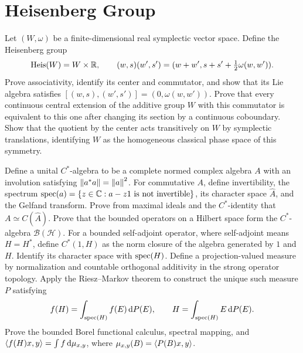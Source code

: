\section{Heisenberg Group}

\begin{exercise}
Let $(W,\omega)$ be a finite-dimensional real symplectic vector space.
Define the Heisenberg group
\[
 \operatorname{Heis}(W)=W\times\mathbb R,
 \qquad (w,s)(w',s')=(w+w',s+s'+\tfrac12\omega(w,w')).
\]
Prove associativity, identify its center and commutator, and show that its Lie
algebra satisfies $[(w,s),(w',s')]=(0,\omega(w,w'))$.  Prove that every
continuous central extension of the additive group $W$ with this commutator
is equivalent to this one after changing its section by a continuous
coboundary.  Show that the quotient by the center acts transitively on $W$ by
symplectic translations, identifying $W$ as the homogeneous classical phase
space of this symmetry.
\end{exercise}

\begin{exercise}
Define a unital $C^*$-algebra to be a complete normed complex algebra $A$
with an involution satisfying $\left\lVert a^*a\right\rVert=\left\lVert a\right\rVert^2$.  For commutative $A$,
define invertibility, the spectrum
$\operatorname{spec}(a)=\{z\in\mathbb C:a-z1\text{ is not invertible}\}$, its character space
$\widehat A$, and the Gelfand transform.  Prove from
maximal ideals and the $C^*$-identity that
$A\simeq C(\widehat A)$.  Prove that the bounded operators on a Hilbert space
form the $C^*$-algebra $\mathcal B(\mathcal H)$.  For a bounded self-adjoint
operator, where self-adjoint means $H=H^*$, define $C^*(1,H)$ as the norm
closure of the algebra generated by $1$ and $H$.
Identify its character space with $\operatorname{spec}(H)$.  Define a projection-valued
measure by normalization and countable orthogonal additivity in the strong
operator topology.  Apply the Riesz--Markov theorem to construct the unique
such measure $P$ satisfying
\[
 f(H)=\int_{\operatorname{spec}(H)}f(E)\,\mathrm d P(E),\qquad
 H=\int_{\operatorname{spec}(H)}E\,\mathrm d P(E).
\]
Prove the bounded Borel functional calculus, spectral mapping, and
$\left\langle f(H)x,y\right\rangle=\int f\,\mathrm d\mu_{x,y}$, where
$\mu_{x,y}(B)=\left\langle P(B)x,y\right\rangle$.
\end{exercise}

